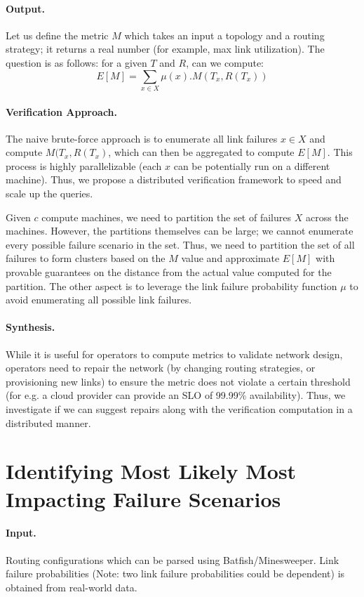 \documentclass[]{article}
\begin{document}
\paragraph{Output.} Let us define the
metric $M$ which takes an input a topology and a routing 
strategy; it returns a 
real number (for example, max link utilization). 
The question is as follows: for a given $T$ and $R$,
can we compute: 
\[
	E[M] = \sum_{x \in X} \mu(x). M(T_x, R(T_x))
\]

\paragraph{Verification Approach.} The naive brute-force 
approach is to enumerate all link failures $x \in X$
and compute $M(T_x, R(T_x)$, which can then be aggregated to 
compute $E[M]$. This process is highly parallelizable (each 
$x$ can be potentially run on a different machine). Thus, we
propose a distributed verification framework to speed and 
scale up the queries.  

Given $c$ compute machines, we need to partition
the set of failures $X$ across
 the machines. However, the partitions themselves
 can be large; we cannot enumerate
 every possible failure scenario in the set. 
 Thus, we need to partition the set of all failures
 to form clusters based on the $M$ value 
 and approximate $E[M]$ with 
 provable guarantees on the distance from the actual 
 value computed for the partition. The other aspect 
 is to leverage the link failure probability function
 $\mu$ to avoid enumerating all possible link failures.
 
  

\paragraph{Synthesis.} While it is useful for operators
to compute metrics to validate network design, operators need
to repair the network (by changing routing strategies, or 
provisioning new links) to ensure the metric does not violate
a certain threshold (for e.g. a cloud provider can provide 
an SLO of 99.99\% availability). Thus, we investigate 
if we can suggest repairs along with the verification computation
in a distributed manner. 
 
\section{Identifying Most Likely Most Impacting Failure Scenarios}
\paragraph{Input.} Routing configurations which can be parsed
using Batfish/Minesweeper. Link failure probabilities (Note: 
two link failure probabilities could be dependent) is obtained
from real-world data. 
\end{document}
